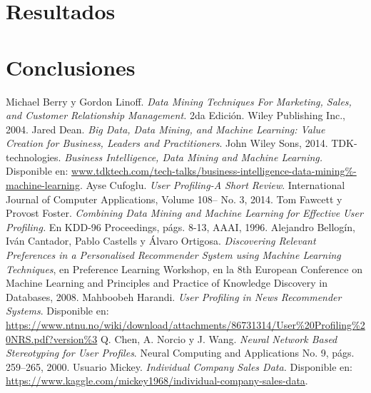 \documentclass[twocolumn, letterpaper,11pt]{article}
\begin{document}
\section{Resultados}
\section{Conclusiones}

\begin{thebibliography}{10}
     Michael Berry y Gordon Linoff. {\em Data Mining Techniques For Marketing, Sales, and Customer Relationship Management.} 
        2da Edición. Wiley Publishing Inc., 2004. 
     Jared Dean. {\em Big Data, Data Mining, and Machine Learning: Value Creation for Business, Leaders and
        Practitioners}. John Wiley  Sons, 2014.
     TDK-technologies. {\em Business Intelligence, Data Mining and Machine Learning.} 
        Disponible en: \url{www.tdktech.com/tech-talks/business-intelligence-data-mining%-machine-learning}. 
     Ayse Cufoglu. {\em User Profiling-A Short Review}. International Journal of Computer Applications,
        Volume 108-- No. 3, 2014.
     Tom Fawcett y Provost Foster. {\em Combining Data Mining and Machine Learning for Effective User
        Profiling.} En KDD-96 Proceedings, págs. 8-13, AAAI, 1996.
     Alejandro Bellogín, Iván Cantador, Pablo Castells y Álvaro Ortigosa. {\em Discovering Relevant Preferences in a Personalised
        Recommender System using Machine Learning Techniques}, en Preference Learning Workshop, en la 8th
        European Conference on Machine  Learning and Principles and Practice of Knowledge Discovery in Databases, 2008. 
     Mahboobeh Harandi. {\em User Profiling in News Recommender Systems}. Disponible en:
        \url{https://www.ntnu.no/wiki/download/attachments/86731314/User%20Profiling%20NRS.pdf?version%3}
         Q. Chen, A. Norcio y J. Wang. {\em Neural Network Based Stereotyping for User Profiles}. Neural
            Computing and Applications No. 9, págs. 259--265,  2000.
         Usuario Mickey. {\em Individual Company Sales Data.} Disponible en:
            \url{https://www.kaggle.com/mickey1968/individual-company-sales-data}. 

\end{thebibliography}
\end{document}
